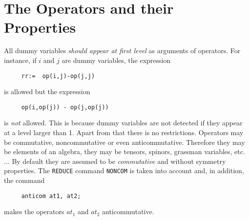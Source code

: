 \section{The Operators and their Properties}
All dummy variables {\em should appear at first level}
as  arguments of operators. For instance, if $i$ and $j$ are 
dummy variables, the expression 
\begin{verbatim}
     rr:=  op(i,j)-op(j,j)
\end{verbatim}
is allowed but the expression 
\begin{verbatim}
     op(i,op(j)) - op(j,op(j))
\end{verbatim}
is {\em not} allowed. This is because dummy variables are not detected 
if they appear at a level larger than 1. 
Apart from that there is no restrictions. Operators  may be 
commutative, noncommutative or even anticommutative. Therefore 
they may be elements of an algebra, they may be tensors,
spinors, grassman variables, etc. $\ldots$
By default they are assumed to be {\em commutative} and without symmetry
properties. The {\tt REDUCE} command {\tt NONCOM} is taken into account 
and, in addition, the command
\begin{verbatim}
     anticom at1, at2;
\end{verbatim}
makes the operators $at_1$ and $at_2$ anticommutative.

